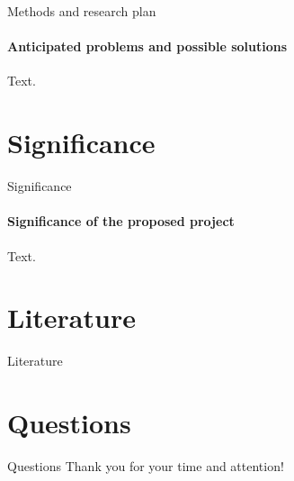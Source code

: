 \documentclass{beamer}
\begin{document}
\begin{frame}[allowframebreaks]{Methods and research plan}
  \framesubtitle{Anticipated problems and possible solutions}
  Text.
\end{frame}

\section{Significance}
\begin{frame}[allowframebreaks]{Significance}
  \framesubtitle{Significance of the proposed project}
    Text.
\end{frame}

\section*{Literature}
\begin{frame}[allowframebreaks]{Literature}
\scriptsize


\nocite{Eichenberger_2022}
\nocite{Fang_2020}
\nocite{Haddad_2017}
\nocite{Kibble1976}
\nocite{Stock_2023}
\nocite{Xu_2016}
\end{frame}

\section*{Questions}
\begin{frame}[allowframebreaks]{Questions}
Thank you for your time and attention!
\end{frame}

\appendix
\end{document}
